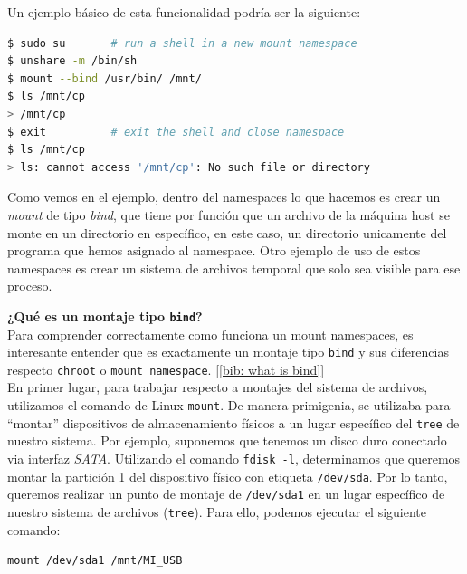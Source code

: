 \documentclass[12pt]{article}
\begin{document}
	
	\noindent Un ejemplo básico de esta funcionalidad podría ser la siguiente:
	
	\addvspace{10px}
	
	\begin{lstlisting}[language=bash, caption=Uso de \texttt{mount namespace} con ``bind'']
$ sudo su		# run a shell in a new mount namespace
$ unshare -m /bin/sh
$ mount --bind /usr/bin/ /mnt/
$ ls /mnt/cp
> /mnt/cp
$ exit			# exit the shell and close namespace
$ ls /mnt/cp
> ls: cannot access '/mnt/cp': No such file or directory
	\end{lstlisting}

	\addvspace{10px}
	
	\par \noindent Como vemos en el ejemplo, dentro del namespaces lo que hacemos es crear un \textit{mount} de tipo \textit{bind}, que tiene por función que un archivo de la máquina host se monte en un directorio en específico, en este caso, un directorio unicamente del programa que hemos asignado al namespace. Otro ejemplo de uso de estos namespaces es crear un sistema de archivos temporal que solo sea visible para ese proceso.
	
	\pagebreak
	
	\noindent \textbf{\large ¿Qué es un montaje tipo \texttt{bind}?}\\
	
	\noindent Para comprender correctamente como funciona un mount namespaces, es interesante entender que es exactamente un montaje tipo \texttt{bind} y sus diferencias respecto \texttt{chroot} o \texttt{mount namespace}. [\ref{bib: what is bind}] \\
	
	\noindent En primer lugar, para trabajar respecto a montajes del sistema de archivos, utilizamos el comando de Linux \texttt{mount}. De manera primigenia, se utilizaba para ``montar'' dispositivos de almacenamiento físicos a un lugar específico del \texttt{tree} de nuestro sistema. Por ejemplo, suponemos que tenemos un disco duro conectado via interfaz \textit{SATA}. Utilizando el comando \texttt{fdisk -l}, determinamos que queremos montar la partición 1 del dispositivo físico con etiqueta \texttt{/dev/sda}. Por lo tanto, queremos realizar un punto de montaje de \texttt{/dev/sda1} en un lugar específico de nuestro sistema de archivos (\texttt{tree}). Para ello, podemos ejecutar el siguiente comando:
	\begin{verbatim}
mount /dev/sda1 /mnt/MI_USB
	\end{verbatim}
\end{document}
